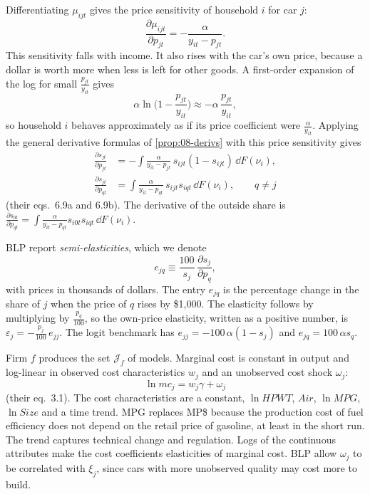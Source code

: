 Differentiating $\mu_{ijt}$ gives the price sensitivity of household $i$ for car $j$:
\begin{equation*}
\frac{\partial\mu_{ijt}}{\partial p_{jt}}=-\frac{\alpha}{y_{it}-p_{jt}} .
\end{equation*}
This sensitivity falls with income. It also rises with the car's own price, because a dollar is
worth more when less is left for other goods. A first-order expansion of the log for small
$\frac{p_{jt}}{y_{it}}$ gives
\begin{equation*}
\alpha\ln\Big(1-\frac{p_{jt}}{y_{it}}\Big)\approx-\alpha\,\frac{p_{jt}}{y_{it}},
\end{equation*}
so household $i$ behaves approximately as if its price coefficient were $\frac{\alpha}{y_{it}}$.
Applying the general derivative formulas of \cref{prop:08-derivs} with this price sensitivity gives
\begin{align}
\frac{\partial s_{jt}}{\partial p_{jt}}&=-\int\frac{\alpha}{y_{it}-p_{jt}}\,
  s_{ijt}(1-s_{ijt})\,\dd F(\nu_i),\label{eq:08-blp-dsown}\\
\frac{\partial s_{jt}}{\partial p_{qt}}&=\int\frac{\alpha}{y_{it}-p_{qt}}\,s_{ijt}s_{iqt}\,
  \dd F(\nu_i),\qquad q\neq j\label{eq:08-blp-dscross}
\end{align}
(their eqs.~6.9a and 6.9b). The derivative of the outside share is
$\frac{\partial s_{0t}}{\partial p_{qt}}=\int\frac{\alpha}{y_{it}-p_{qt}}s_{i0t}s_{iqt}\,\dd F(\nu_i)$.

BLP report \emph{semi-elasticities}, which we denote
\begin{equation}\label{eq:08-blp-semi}
e_{jq}\equiv\frac{100}{s_j}\,\frac{\partial s_j}{\partial p_q},
\end{equation}
with prices in thousands of dollars. The entry $e_{jq}$ is the percentage change in the share of $j$
when the price of $q$ rises by \$1,000. The elasticity follows by multiplying by
$\frac{p_q}{100}$, so the own-price elasticity, written as a positive number, is
$\varepsilon_j=-\frac{p_j}{100}\,e_{jj}$. The logit benchmark has $e_{jj}=-100\,\alpha(1-s_j)$ and
$e_{jq}=100\,\alpha s_q$.

Firm $f$ produces the set $\mathcal{J}_f$ of models. Marginal cost is constant in output and log-linear
in observed cost characteristics $w_j$ and an unobserved cost shock $\omega_j$:
\begin{equation}\label{eq:08-blp-mc}
\ln mc_j=w_j\gamma+\omega_j
\end{equation}
(their eq.~3.1). The cost characteristics are a constant, $\ln\mathit{HPWT}$, $\mathit{Air}$,
$\ln\mathit{MPG}$, $\ln\mathit{Size}$ and a time trend. MPG replaces MP\$ because the production cost
of fuel efficiency does not depend on the retail price of gasoline, at least in the short run. The
trend captures technical change and regulation. Logs of the continuous attributes make the cost
coefficients elasticities of marginal cost. BLP allow $\omega_j$ to be correlated with $\xi_j$, since
cars with more unobserved quality may cost more to build.


